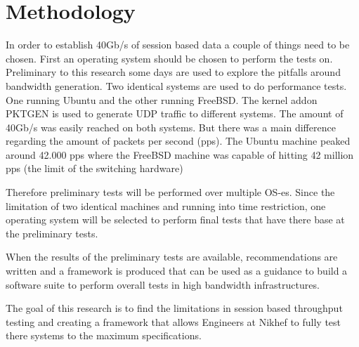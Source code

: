 \section{Methodology}
In order to establish 40Gb/s of session based data a couple of things need to be chosen.
First an operating system should be chosen to perform the tests on. Preliminary to this research some days are used to explore the pitfalls around bandwidth generation. Two identical systems are used to do performance tests.
One running Ubuntu and the other running FreeBSD. 
The kernel addon PKTGEN is used to generate UDP traffic to different systems. The amount of 40Gb/s was easily reached on both systems.
But there was a main difference regarding the amount of packets per second (pps). The Ubuntu machine peaked around 42.000 pps where the FreeBSD machine was capable of hitting 42 million pps (the limit of the switching hardware)

Therefore preliminary tests will be performed over multiple OS-es. Since the limitation of two identical machines and running into time restriction, one operating system will be selected to perform final tests that have there base at the preliminary tests.

When the results of the preliminary tests are available, recommendations are written and a framework is produced that can be used as a guidance to build a software suite to perform overall tests in high bandwidth infrastructures.

The goal of this research is to find the limitations in session based throughput testing and creating a framework that allows Engineers at Nikhef to fully test there systems to the maximum specifications. 
